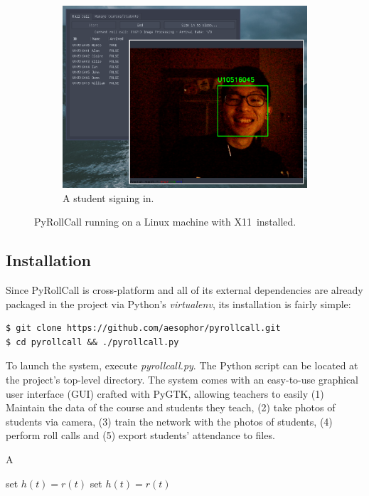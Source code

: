 \begin{figure}[!htb]
\begin{subfigure}[b]{0.32\linewidth}
    \includegraphics[width=\linewidth]{figures/preview3.eps}
    \caption{A student signing in.}
  \end{subfigure}
  \caption{PyRollCall running on a Linux machine with X11\protect\footnotemark \ installed.}
  \label{fig:systemAppearance}
\end{figure}



\subsection{Installation}
Since PyRollCall is cross-platform and all of its external dependencies are already packaged
in the project via Python's \emph{virtualenv}, its installation is fairly simple:

\begin{lstlisting}[numbers=none,xleftmargin=0em,caption={Shell commands to checkout and run PyRollCall}]
$ git clone https://github.com/aesophor/pyrollcall.git
$ cd pyrollcall && ./pyrollcall.py 
\end{lstlisting}

To launch the system, execute \emph{pyrollcall.py}. The Python script can be located at the project's top-level directory.
The system comes with an easy-to-use graphical user interface (GUI) crafted with PyGTK,
allowing teachers to easily
(1) Maintain the data of the course and students they teach,
(2) take photos of students via camera,
(3) train the network with the photos of students,
(4) perform roll calls and
(5) export students' attendance to files.

\begin{algorithm}  
\caption{A}  
\label{alg:A}  
\begin{algorithmic}  
\REPEAT   
\STATE set $h(t)=r(t)$   
\REPEAT  
\STATE set $h(t)=r(t)$   
\end{algorithmic}  
\end{algorithm}  
